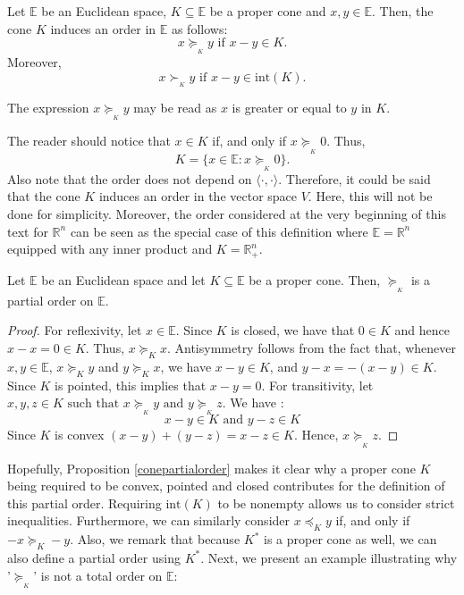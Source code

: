 \documentclass[a4paper]{article}
\begin{document}
\begin{definition}{}

Let $\mathbb{E}$ be an Euclidean space, $K\subseteq\mathbb{E}$ 
be a proper cone and $x,y \in \mathbb{E}$. Then, the 
cone $K$ induces an order in $\mathbb{E}$ as follows:
$$ x \succeq_{_K} y \text{ if }  x-y \in K.$$
Moreover,
$$ x \succ_{_K} y \text{ if } x-y \in \text{int}(K).$$

\end{definition}
 The expression \(x \succeq_{_K} y\)  may be read as $x$ is 
greater or equal to $y$ in $K$. 


The reader should notice that $x\in K$ if, and only if   \(x \succeq_{_K} 0 \). Thus, 
\[K=\{x\in \mathbb{E} \colon x \succeq_{_K}  0\}.\]
 Also note that the order does not depend on $\langle\cdot,\cdot\rangle$. Therefore, it could be said that the cone $K$ induces an order in the vector space $V$. Here, this  will not be done for simplicity. Moreover, the order considered at the very beginning of this text for $\mathbb{R}^n$ can be seen as the special case of this definition where 
$\mathbb{E}=\mathbb{R}^n$ equipped with any inner product and $K=\mathbb{R}_+^n$. 


\begin{lemma}\label{conepartialorder}

Let $\mathbb{E}$ be an Euclidean space and let 
$K\subseteq\mathbb{E}$ be a proper cone. Then, 
\mbox{$\succeq_{_K}$} is a partial order on $\mathbb{E}$.
\end{lemma}

\begin{proof}
For reflexivity, let $x\in\mathbb{E}$. Since $K$ is closed, we have that \(0\in K\) and hence \mbox{$x-x=0\in K$.} Thus, $x\succeq_K x$. Antisymmetry follows from the fact that, 
whenever $x,y\in\mathbb{E}$, $x\succeq_K y$ and $y\succeq_K x$, we have $x-y\in K$, and $y-x=-(x-y)\in K$. Since $K$ is pointed, this implies that $x-y=0$.   
For transitivity, let $x, y, z\in K\mbox{ such that   }x\succeq_{_K}y\mbox{ and }y\succeq_{_K}z$. We have :
$$ x-y\in K \mbox{ and } y-z\in K    $$
Since $K$ is convex $(x-y)+(y-z)=x-z\in K$. Hence, $x\succeq_{_K}z$.\qedhere

\end{proof}

Hopefully, Proposition \ref{conepartialorder} makes it clear why a proper cone
$K$ being required to be convex, pointed and closed contributes for the
definition of this partial order.  Requiring
\(\text{int}(K)\) to be nonempty allows us to consider strict inequalities.
Furthermore, we can similarly consider  \(x\preceq_K y\) if, and only if
$-x\succeq_K -y$. Also, we remark that because \(K^\ast\) is a proper cone as well, we can also
define a partial order using  $K^\ast$. Next, we present an example illustrating why '$\succeq_{_K}$' is not a total order on $\mathbb{E}$:
\end{document}
